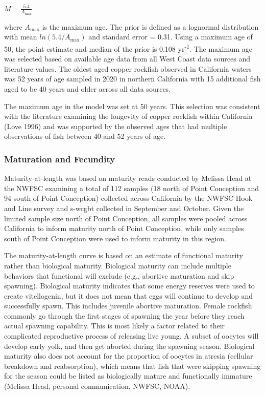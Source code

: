 \documentclass[11pt,
  english,
  letterpaper,
]{article}
\begin{document}
\begin{centering}

$M=\frac{5.4}{A_{\text{max}}}$

\end{centering}

\vspace{0.5cm}

where \(A_{\text{max}}\) is the maximum age. The prior is defined as a lognormal distribution with mean \(ln(5.4/A_{\text{max}})\) and standard error = 0.31. Using a maximum age of 50, the point estimate and median of the prior is 0.108 yr\textsuperscript{-1}. The maximum age was selected based on available age data from all West Coast data sources and literature values. The oldest aged copper rockfish observed in California waters was 52 years of age sampled in 2020 in northern California with 15 additional fish aged to be 40 years and older across all data sources.

The maximum age in the model was set at 50 years. This selection was consistent with the literature examining the longevity of copper rockfish within California (Love 1996) and was supported by the observed ages that had multiple observations of fish between 40 and 52 years of age.

\hypertarget{maturation-and-fecundity}{%
\subsubsection{Maturation and Fecundity}\label{maturation-and-fecundity}}

Maturity-at-length was based on maturity reads conducted by Melissa Head at the NWFSC examining a total of 112 samples (18 north of Point Conception and 94 south of Point Conception) collected across California by the NWFSC Hook and Line survey and \Gls{s-wcgbt} collected in September and October. Given the limited sample size north of Point Conception, all samples were pooled across California to inform maturity north of Point Conception, while only samples south of Point Conception were used to inform maturity in this region.

The maturity-at-length curve is based on an estimate of functional maturity rather than biological maturity. Biological maturity can include multiple behaviors that functional will exclude (e.g., abortive maturation and skip spawning). Biological maturity indicates that some energy reserves were used to create vitellogenin, but it does not mean that eggs will continue to develop and successfully spawn. This includes juvenile abortive maturation. Female rockfish commonly go through the first stages of spawning the year before they reach actual spawning capability. This is most likely a factor related to their complicated reproductive process of releasing live young. A subset of oocytes will develop early yolk, and then get aborted during the spawning season. Biological maturity also does not account for the proportion of oocytes in atresia (cellular breakdown and reabsorption), which means that fish that were skipping spawning for the season could be listed as biologically mature and functionally immature (Melissa Head, personal communication, NWFSC, NOAA).
\end{document}
